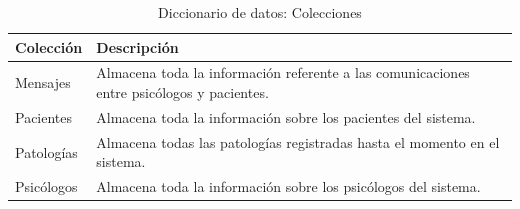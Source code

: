\begin{table}[htpb]
\centering
\begin{tabularx}{\textwidth}{|l|X|}
\hline
\rowcolor[gray]{0.9}\textbf{Colección}  & \textbf{Descripción}                                                                               \\ \hline
Mensajes   & Almacena toda la información referente a las comunicaciones entre psicólogos y pacientes. \\ \hline
Pacientes  & Almacena toda la información sobre los pacientes del sistema.                             \\ \hline
Patologías & Almacena todas las patologías registradas hasta el momento en el sistema.                 \\ \hline
Psicólogos & Almacena toda la información sobre los psicólogos del sistema.                            \\ \hline
\end{tabularx}
\caption{Diccionario de datos: Colecciones}
\label{fig:dic_datos_colecciones}
\end{table}


